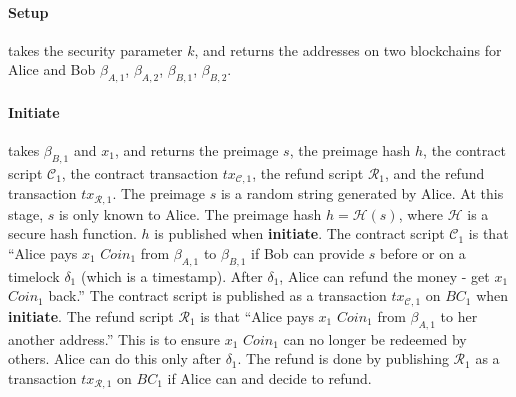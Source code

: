 
\paragraph{\textbf{Setup}}
takes the security parameter $k$,
and returns the addresses on two blockchains for Alice and Bob $\beta_{A, 1}$, $\beta_{A, 2}$, $\beta_{B, 1}$, $\beta_{B, 2}$.

\paragraph{\textbf{Initiate}}
takes $\beta_{B, 1}$ and $x_1$,
and returns the preimage $s$, the preimage hash $h$, the contract script $\mathcal{C}_1$, the contract transaction $tx_{\mathcal{C}, 1}$, the refund script $\mathcal{R}_1$, and the refund transaction $tx_{\mathcal{R}, 1}$.
The preimage $s$ is a random string generated by Alice. At this stage, $s$ is only known to Alice.
The preimage hash $h = \mathcal{H}(s)$, where $\mathcal{H}$ is a secure hash function.  $h$ is published when \textbf{initiate}.
The contract script $\mathcal{C}_1$ is that ``Alice pays $x_1$ $Coin_1$ from $\beta_{A, 1}$ to $\beta_{B, 1}$ if Bob can provide $s$ before or on a timelock $\delta_1$ (which is a timestamp). After $\delta_1$, Alice can refund the money - get $x_1$ $Coin_1$ back.''
The contract script is published as a transaction $tx_{\mathcal{C}, 1}$ on $BC_1$ when \textbf{initiate}.
The refund script $\mathcal{R}_1$ is that ``Alice pays $x_1$ $Coin_1$ from $\beta_{A, 1}$ to her another address.'' This is to ensure $x_1$ $Coin_1$ can no longer be redeemed by others. Alice can do this only after $\delta_1$.
The refund is done by publishing $\mathcal{R}_1$ as a transaction $tx_{\mathcal{R}, 1}$ on $BC_1$ if Alice can and decide to refund.

